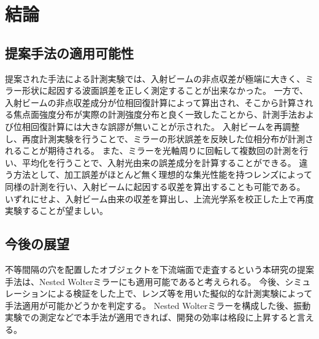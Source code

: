 \chapter{結論}
\thispagestyle{empty}
\label{chap6}
\graphicspath{{chap6/figure/}}
\minitoc

\newpage


\section{提案手法の適用可能性}
\label{chap6_conclusion}

提案された手法による計測実験では、入射ビームの非点収差が極端に大きく、ミラー形状に起因する波面誤差を正しく測定することが出来なかった。
一方で、入射ビームの非点収差成分が位相回復計算によって算出され、そこから計算される焦点面強度分布が実際の計測強度分布と良く一致したことから、計測手法および位相回復計算には大きな誤謬が無いことが示された。
入射ビームを再調整し、再度計測実験を行うことで、ミラーの形状誤差を反映した位相分布が計測されることが期待される。
また、ミラーを光軸周りに回転して複数回の計測を行い、平均化を行うことで、入射光由来の誤差成分を計算することができる。
違う方法として、加工誤差がほとんど無く理想的な集光性能を持つレンズによって同様の計測を行い、入射ビームに起因する収差を算出することも可能である。
いずれにせよ、入射ビーム由来の収差を算出し、上流光学系を校正した上で再度実験することが望ましい。

\section{今後の展望}
\label{chap6_futureworks}

不等間隔の穴を配置したオブジェクトを下流端面で走査するという本研究の提案手法は、Nested Wolterミラーにも適用可能であると考えられる。
今後、シミュレーションによる検証をした上で、レンズ等を用いた擬似的な計測実験によって手法適用が可能かどうかを判定する。
Nested Wolterミラーを構成した後、振動実験での測定などで本手法が適用できれば、開発の効率は格段に上昇すると言える。

\clearpage
\newpage


